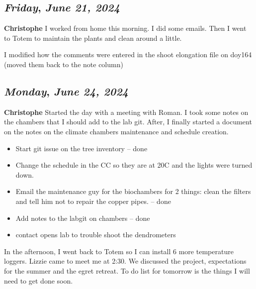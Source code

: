 \begin {itemize}
\def\day{\textit{June 21, 2024}}
\def\weekday{\textit{Friday}}
\subsection*{\weekday, \day}
\textbf {Christophe}
I worked from home this morning. I did some emails. Then I went to Totem to maintain the plants and clean around a little.
\par I modified how the comments were entered in the shoot elongation file on doy164 (moved them back to the note column)

\def\day{\textit{June 24, 2024}}
\def\weekday{\textit{Monday}}
\subsection*{\weekday, \day}
\textbf {Christophe}
Started the day with a meeting with Roman. I took some notes on the chambers that I should add to the lab git. After, I finally started a document on the notes on the climate chambers maintenance and schedule creation.
\begin {itemize}
	\item Start git issue on the tree inventory -- done
	\item Change the schedule in the CC so they are at 20C and the lights were turned down. 
	\item Email the maintenance guy for the biochambers for 2 things: clean the filters and tell him not to repair the copper pipes.  -- done
	\item Add notes to the labgit on chambers -- done
	\item contact opens lab to trouble shoot the dendrometers
\end {itemize}

\par In the afternoon, I went back to Totem so I can install 6 more temperature loggers. Lizzie came to meet me at 2:30. We discussed the project, expectations for the summer and the egret retreat. To do list for tomorrow is the things I will need to get done soon. 

\def\day{\textit{June 25, 2024}}
\def\weekday{\textit{Tuesday}}

\end{itemize}
